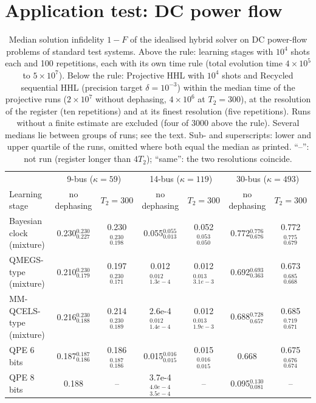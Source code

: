 \documentclass[journal]{IEEEtran}
\begin{document}
\section{Application test: DC power flow}
\label{sec:grid}

\begin{table}[t]
\caption{Median solution infidelity $1-F$ of the idealised hybrid solver on DC power-flow problems of standard test systems. Above the rule: learning stages with $10^4$ shots each and 100 repetitions, each with its own time rule (total evolution time $4\times10^5$ to $5\times10^7$). Below the rule: Projective HHL with $10^4$ shots and Recycled sequential HHL (precision target $\delta=10^{-3}$) within the median time of the projective runs ($2\times10^7$ without dephasing, $4\times10^6$ at $T_2=300$), at the resolution of the register (ten repetitions) and at its finest resolution (five repetitions). Runs without a finite estimate are excluded (four of $3000$ above the rule). Several medians lie between groups of runs; see the text. Sub- and superscripts: lower and upper quartile of the runs, omitted where both equal the median as printed. ``--'': not run (register longer than $4T_2$); ``same'': the two resolutions coincide.}
\label{tab:grid}
\centering\footnotesize\renewcommand{\arraystretch}{1.3}
\begin{tabular}{lcccccc}
\toprule
 & \multicolumn{2}{c}{9-bus ($\kappa=59$)} & \multicolumn{2}{c}{14-bus ($\kappa=119$)} & \multicolumn{2}{c}{30-bus ($\kappa=493$)}\\
Learning stage & no dephasing & $T_2=300$ & no dephasing & $T_2=300$ & no dephasing & $T_2=300$\\
\midrule
Bayesian clock (mixture) & 0.230$_{0.227}^{0.230}$ & 0.230$_{0.198}^{0.230}$ & 0.055$_{0.013}^{0.055}$ & 0.052$_{0.050}^{0.053}$ & 0.772$_{0.676}^{0.776}$ & 0.772$_{0.679}^{0.775}$\\
QMEGS-type (mixture) & 0.210$_{0.179}^{0.230}$ & 0.197$_{0.171}^{0.230}$ & 0.012$_{1.3e-4}^{0.012}$ & 0.012$_{3.1e-3}^{0.013}$ & 0.692$_{0.363}^{0.693}$ & 0.673$_{0.668}^{0.685}$\\
MM-QCELS-type (mixture) & 0.216$_{0.188}^{0.230}$ & 0.214$_{0.189}^{0.230}$ & 2.6e-4$_{1.4e-4}^{0.012}$ & 0.012$_{1.9e-3}^{0.013}$ & 0.688$_{0.657}^{0.728}$ & 0.685$_{0.671}^{0.719}$\\
QPE 6 bits & 0.187$_{0.186}^{0.187}$ & 0.186$_{0.186}^{0.187}$ & 0.015$_{0.015}^{0.016}$ & 0.015$_{0.015}^{0.016}$ & 0.668 & 0.675$_{0.674}^{0.676}$\\
QPE 8 bits & 0.188 & -- & 3.7e-4$_{3.5e-4}^{4.0e-4}$ & -- & 0.095$_{0.081}^{0.130}$ & --\\

\end{tabular}
\end{table}
\end{document}
